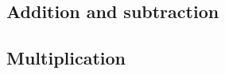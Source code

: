\documentclass[a4paper,11pt]{kth-mag}
\begin{document}

\subsection{Addition and subtraction}


\subsection{Multiplication}





\appendix
\addappheadtotoc
\end{document}
